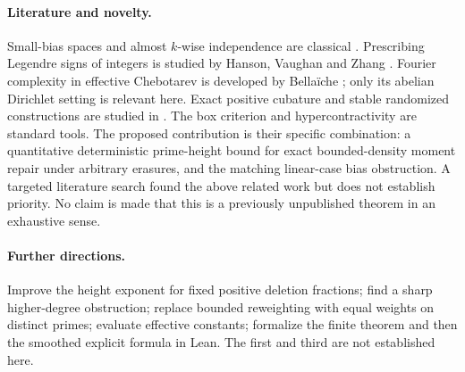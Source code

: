 \documentclass[11pt]{article}
\theoremstyle{remark}\newtheorem{remark}[theorem]{Remark}
\begin{document}
\paragraph{Literature and novelty.} Small-bias spaces and almost $k$-wise independence are classical \cite{naor}. Prescribing Legendre signs of integers is studied by Hanson, Vaughan and Zhang \cite{hvz}. Fourier complexity in effective Chebotarev is developed by Bella\"iche \cite{bellaiche}; only its abelian Dirichlet setting is relevant here. Exact positive cubature and stable randomized constructions are studied in \cite{glaubitz,migliorati}. The box criterion and hypercontractivity are standard tools. The proposed contribution is their specific combination: a quantitative deterministic prime-height bound for exact bounded-density moment repair under arbitrary erasures, and the matching linear-case bias obstruction. A targeted literature search found the above related work but does not establish priority. No claim is made that this is a previously unpublished theorem in an exhaustive sense.

\paragraph{Further directions.} Improve the height exponent for fixed positive deletion fractions; find a sharp higher-degree obstruction; replace bounded reweighting with equal weights on distinct primes; evaluate effective constants; formalize the finite theorem and then the smoothed explicit formula in Lean. The first and third are not established here.
\end{document}

